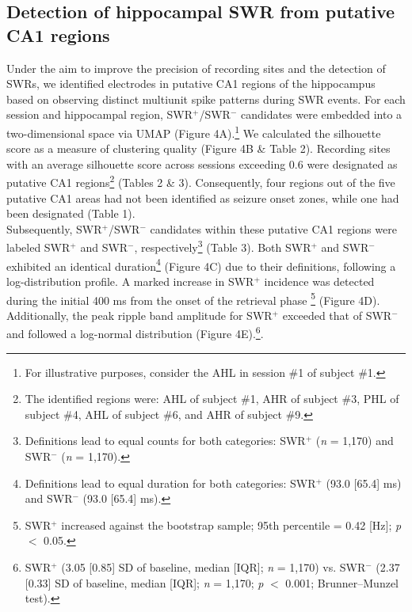 \documentclass[final,3p,times,twocolumn]{elsarticle}
\begin{document}
\subsection{Detection of hippocampal SWR from putative CA1 regions}
Under the aim to improve the precision of recording sites and the detection of SWRs, we identified electrodes in putative CA1 regions of the hippocampus based on observing distinct multiunit spike patterns during SWR events. For each session and hippocampal region, SWR$^+$/SWR$^-$ candidates were embedded into a two-dimensional space via UMAP (Figure 4A).\footnote{For illustrative purposes, consider the AHL in session \#1 of subject \#1.} We calculated the silhouette score as a measure of clustering quality (Figure 4B \& Table 2). Recording sites with an average silhouette score across sessions exceeding 0.6 were designated as putative CA1 regions\footnote{The identified regions were: AHL of subject \#1, AHR of subject \#3, PHL of subject \#4, AHL of subject \#6, and AHR of subject \#9.}  (Tables 2 \& 3). Consequently, four regions out of the five putative CA1 areas had not been identified as seizure onset zones, while one had been designated (Table 1).
\\
\indent
Subsequently, SWR$^+$/SWR$^-$ candidates within these putative CA1 regions were labeled SWR$^+$ and SWR$^-$, respectively\footnote{Definitions lead to equal counts for both categories: SWR$^+$ (\textit{n} = 1,170) and SWR$^-$ (\textit{n} = 1,170).}  (Table 3). Both SWR$^+$ and SWR$^-$ exhibited an identical duration\footnote{Definitions lead to equal duration for both categories: SWR$^+$ (93.0 [65.4] ms) and SWR$^-$ (93.0 [65.4] ms).}  (Figure 4C) due to their definitions, following a log-distribution profile. A marked increase in SWR$^+$ incidence was detected during the initial 400 ms from the onset of the retrieval phase \footnote{SWR$^+$ increased against the bootstrap sample; 95th percentile = 0.42 [Hz]; \textit{p} $<$ 0.05.}  (Figure 4D). Additionally, the peak ripple band amplitude for SWR$^+$ exceeded that of SWR$^-$ and followed a log-normal distribution (Figure 4E).\footnote{SWR$^+$ (3.05 [0.85] SD of baseline, median [IQR]; \textit{n} = 1,170) vs. SWR$^-$ (2.37 [0.33] SD of baseline, median [IQR]; \textit{n} = 1,170; \textit{p} $<$ 0.001; Brunner--Munzel test).}.
\end{document}
